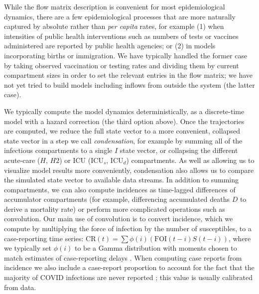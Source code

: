 \documentclass[12pt]{article}\usepackage[]{graphicx}\usepackage[]{color}
\begin{document}
While the flow matrix description is convenient for most epidemiological dynamics, there are a few epidemiological processes that are more naturally captured by absolute rather than \emph{per capita} rates, for example (1) when intensities of public health interventions such as numbers of tests or vaccines administered are reported by public health agencies; or (2) in models incorporating births or immigration.
We have typically handled the former case by taking observed vaccination or testing rates and dividing them by current compartment sizes in order to set the relevant entries in the flow matrix; we have not yet tried to build models including inflows from outside the system (the latter case).
 

We typically compute the model dynamics deterministically, as a discrete-time model with a hazard correction (the third option above).  Once the trajectories are computed, we reduce the full state vector to a more convenient, collapsed state vector in a step we call \emph{condensation}, for example by summing all of the infectious compartments to a single $I$ state vector, or collapsing the different acute-care ($H$, $H2$) or ICU ($\textrm{ICU}_s$, $\textrm{ICU}_d$) compartments.
As well as allowing us to visualize model results more conveniently, condensation also allows us to compare the simulated state vector to available data streams.
In addition to summing compartments, we can also compute incidences as time-lagged differences of accumulator compartments (for example, differencing accumulated deaths $D$ to derive a mortality rate) or perform more complicated operations such as convolution. 
Our main use of convolution is to convert incidence, which we compute by multiplying the force of infection by the number of susceptibles, to a case-reporting time series: $\textrm{CR}(t) = \sum \phi(i) (\textrm{FOI}(t-i) S(t-i))$, where we typically set $\phi(i)$ to be a Gamma distribution with
moments chosen to match estimates of case-reporting delays
.
When computing case reports from incidence we also include a case-report proportion  to account for the fact that the majority of COVID infections are never reported \cite{Doug+2020}; this value is usually calibrated from data.
\end{document}
